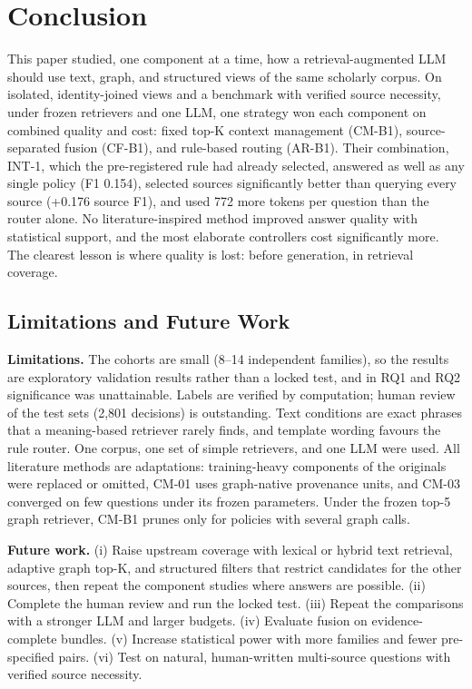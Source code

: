\documentclass[conference]{IEEEtran}
\begin{document}
\section{Conclusion}\label{sec:conclusion}

This paper studied, one component at a time, how a retrieval-augmented LLM should use text, graph, and structured views of the same scholarly corpus. On isolated, identity-joined views and a benchmark with verified source necessity, under frozen retrievers and one LLM, one strategy won each component on combined quality and cost: fixed top-K context management (CM-B1), source-separated fusion (CF-B1), and rule-based routing (AR-B1). Their combination, INT-1, which the pre-registered rule had already selected, answered as well as any single policy (F1 0.154), selected sources significantly better than querying every source (+0.176 source F1), and used 772 more tokens per question than the router alone. No literature-inspired method improved answer quality with statistical support, and the most elaborate controllers cost significantly more. The clearest lesson is where quality is lost: before generation, in retrieval coverage.

\subsection{Limitations and Future Work}

\textbf{Limitations.} The cohorts are small (8--14 independent families), so the results are exploratory validation results rather than a locked test, and in RQ1 and RQ2 significance was unattainable. Labels are verified by computation; human review of the test sets (2,801 decisions) is outstanding. Text conditions are exact phrases that a meaning-based retriever rarely finds, and template wording favours the rule router. One corpus, one set of simple retrievers, and one LLM were used. All literature methods are adaptations: training-heavy components of the originals were replaced or omitted, CM-01 uses graph-native provenance units, and CM-03 converged on few questions under its frozen parameters. Under the frozen top-5 graph retriever, CM-B1 prunes only for policies with several graph calls.

\textbf{Future work.} (i) Raise upstream coverage with lexical or hybrid text retrieval, adaptive graph top-K, and structured filters that restrict candidates for the other sources, then repeat the component studies where answers are possible. (ii) Complete the human review and run the locked test. (iii) Repeat the comparisons with a stronger LLM and larger budgets. (iv) Evaluate fusion on evidence-complete bundles. (v) Increase statistical power with more families and fewer pre-specified pairs. (vi) Test on natural, human-written multi-source questions with verified source necessity.
\end{document}
